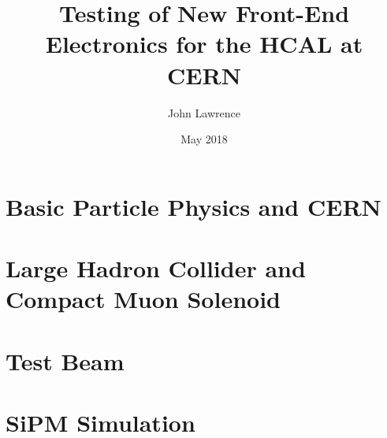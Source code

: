 \documentclass
[]
{thesis}
\title{Testing of New Front-End Electronics for the HCAL at CERN}
\author{John Lawrence}
\date{May 2018}
\begin{document}
	
\chapter{Basic Particle Physics and CERN}
\label{chap:intro}


\chapter{Large Hadron Collider and Compact Muon Solenoid}
\label{chap:LHC_CMS}


\chapter{Test Beam}
\label{chap:test}


\chapter{SiPM Simulation}
\label{chap:sim}

\end{document}
